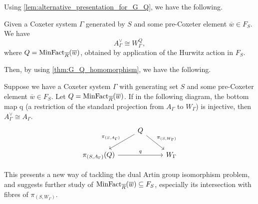 Using \cref{lem:alternative_presentation_for_G_Q}, we have the following.

\begin{lemma}
	Given a Coxeter system $\Gamma$ generated by  $S$ and some pre-Coxeter element $\overline{w} \in F_S$.
	We have
	\[
		A^\vee_\Gamma \cong W_\Gamma^Q
		,\] where  $Q=\operatorname{MinFact}_{\overline{R}}(\overline{w})$, obtained by application of the Hurwitz action in  $F_S$.
\end{lemma}

Then, by using \cref{thm:G_Q_homomorphism}, we have the following.

\begin{proposition}
	Suppose we have a Coxeter system $\Gamma$ with generating set $S$ and some pre-Coxeter element $\overline{w} \in F_S$.
	Let $Q = \operatorname{MinFact}_{\overline{R}}(\overline{w})$.
	If in the following diagram, the bottom map q (a restriction of the standard projection from $A_\Gamma$ to  $W_\Gamma$) is injective, then $A^\vee_\Gamma \cong A_\Gamma$.
	\[
		\begin{tikzcd}
			& Q \ar[dl, "\pi_{(S,A_\Gamma)}"'] \ar[dr, "\pi_{(S,W_\Gamma)}"] & \\
			\pi_{(S,A_\Gamma)}(Q) \ar[rr, "q"] & & W_\Gamma
		\end{tikzcd}
	\]
\end{proposition}

This presents a new way of tackling the dual Artin group isomorphism problem, and suggests further study of $\operatorname{MinFact}_{\overline{R}}(\overline{w}) \subseteq F_S$, especially its intersection with fibres of $\pi_{(S,W_\Gamma)}$.
